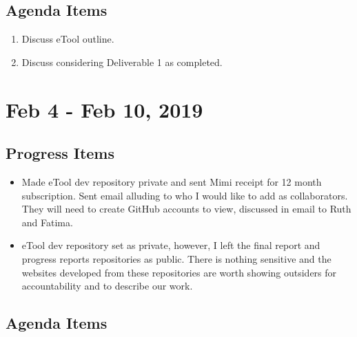 \documentclass[]{article}
\providecommand{\tightlist}{%
  \setlength{\itemsep}{0pt}\setlength{\parskip}{0pt}}
\begin{document}
\hypertarget{agenda-items-6}{%
\subsection{Agenda Items}\label{agenda-items-6}}

\begin{enumerate}
\def\labelenumi{\arabic{enumi}.}
\tightlist
\item
  Discuss eTool outline.
\item
  Discuss considering Deliverable 1 as completed.
\end{enumerate}

\hypertarget{feb-4---feb-10-2019}{%
\section{Feb 4 - Feb 10, 2019}\label{feb-4---feb-10-2019}}

\hypertarget{progress-items-7}{%
\subsection{Progress Items}\label{progress-items-7}}

\begin{itemize}
\tightlist
\item
  Made eTool dev repository private and sent Mimi receipt for 12 month
  subscription. Sent email alluding to who I would like to add as
  collaborators. They will need to create GitHub accounts to view,
  discussed in email to Ruth and Fatima.
\item
  eTool dev repository set as private, however, I left the final report
  and progress reports repositories as public. There is nothing
  sensitive and the websites developed from these repositories are worth
  showing outsiders for accountability and to describe our work.
\end{itemize}

\hypertarget{agenda-items-7}{%
\subsection{Agenda Items}\label{agenda-items-7}}
\end{document}
